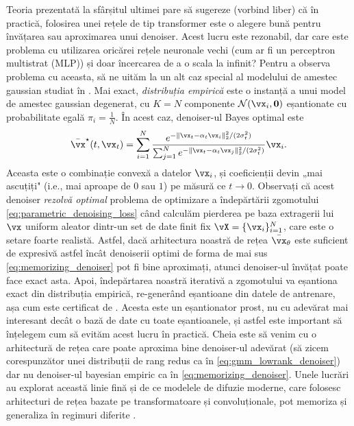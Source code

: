 \documentclass[../../book-main_ro.tex]{subfiles}
\begin{document}
\begin{remark}
	Teoria prezentată la sfârșitul ultimei  pare să sugereze (vorbind liber) că în practică, folosirea unei rețele de tip transformer este o alegere bună pentru învățarea sau aproximarea unui denoiser. Acest lucru este rezonabil, dar care este problema cu utilizarea oricărei rețele neuronale vechi (cum ar fi un perceptron multistrat (MLP)) și doar încercarea de a o scala la infinit? Pentru a observa problema cu aceasta, să ne uităm la un alt caz special al modelului de amestec gaussian studiat în . Mai exact, \textit{distribuția empirică} este o instanță a unui model de amestec gaussian degenerat, cu \(K = N\) componente \(\dNorm(\vx_{i}, \vzero)\) eșantionate cu probabilitate egală \(\pi_{i} = \frac{1}{N}\). În acest caz, denoiser-ul Bayes optimal este
	\begin{equation}\label{eq:memorizing_denoiser}
		\bar{\vx}^{\star}(t, \vx_{t}) = \sum_{i = 1}^{N}\frac{e^{-\|\vx_{t} - \alpha_{t}\vx_{i}\|_{2}^{2}/(2\sigma_{t}^{2})}}{\sum_{j = 1}^{N}e^{-\|\vx_{t} - \alpha_{t}\vx_{j}\|_{2}^{2}/(2\sigma_{t}^{2})}}\vx_{i}.
	\end{equation}
	Aceasta este o combinație convexă a datelor \(\vx_{i}\), și coeficienții devin „mai ascuțiți" (i.e., mai aproape de \(0\) sau \(1\)) pe măsură ce \(t \to 0\). Observați că acest denoiser \textit{rezolvă optimal} problema de optimizare a îndepărtării zgomotului \eqref{eq:parametric_denoising_loss} când calculăm pierderea pe baza extragerii lui \(\vx\) uniform aleator dintr-un set de date finit fix \(\vX = \{\vx_{i}\}_{i = 1}^{N}\), care este o setare foarte realistă. Astfel, dacă arhitectura noastră de rețea \(\bar{\vx}_{\theta}\) este suficient de expresivă astfel încât denoiserii optimi de forma de mai sus \eqref{eq:memorizing_denoiser} pot fi bine aproximați, atunci denoiser-ul învățat poate face exact asta. Apoi, îndepărtarea noastră iterativă a zgomotului  va eșantiona exact din distribuția empirică, re-generând eșantioane din datele de antrenare, așa cum este certificat de . Acesta este un eșantionator prost, nu cu adevărat mai interesant decât o bază de date cu toate eșantioanele, și astfel este important să înțelegem cum să evităm acest lucru în practică. Cheia este să venim cu o arhitectură de rețea care poate aproxima bine denoiser-ul adevărat (să zicem corespunzător unei distribuții de rang redus ca în \eqref{eq:gmm_lowrank_denoiser}) dar nu denoiser-ul bayesian empiric ca în \eqref{eq:memorizing_denoiser}. Unele lucrări au explorat această linie fină și de ce modelele de difuzie moderne, care folosesc arhitecturi de rețea bazate pe transformatoare și convoluționale, pot memoriza și generaliza în regimuri diferite \citep{kamb2024analytic,niedoba2024towards}.


\end{remark}
\end{document}
